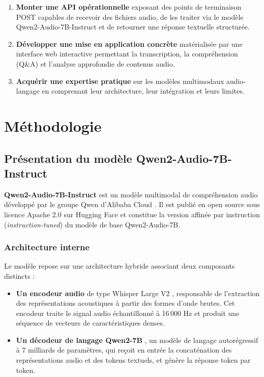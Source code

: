 \documentclass[12pt,a4paper]{report}
\begin{document}
\begin{enumerate}
  \item \textbf{Monter une API opérationnelle} exposant des points de terminaison POST
        capables de recevoir des fichiers audio, de les traiter via le modèle
        Qwen2-Audio-7B-Instruct et de retourner une réponse textuelle structurée.

  \item \textbf{Développer une mise en application concrète} matérialisée par une interface
        web interactive permettant la transcription, la compréhension (Q\&A) et l'analyse
        approfondie de contenus audio.

  \item \textbf{Acquérir une expertise pratique} sur les modèles multimodaux audio-langage
        en comprenant leur architecture, leur intégration et leurs limites.
\end{enumerate}

\chapter{Méthodologie}

\section{Présentation du modèle Qwen2-Audio-7B-Instruct}

\textbf{Qwen2-Audio-7B-Instruct} est un modèle multimodal de compréhension audio développé
par le groupe Qwen d'Alibaba Cloud \cite{qwen2audio}. Il est publié en open source sous
licence Apache 2.0 sur Hugging Face et constitue la version affinée par instruction
(\textit{instruction-tuned}) du modèle de base Qwen2-Audio-7B.

\subsection{Architecture interne}

Le modèle repose sur une architecture hybride associant deux composants distincts :

\begin{itemize}
  \item \textbf{Un encodeur audio} de type Whisper Large V2 \cite{whisper}, responsable de
        l'extraction des représentations acoustiques à partir des formes d'onde brutes.
        Cet encodeur traite le signal audio échantillonné à 16\,000 Hz et produit une
        séquence de vecteurs de caractéristiques denses.

  \item \textbf{Un décodeur de langage Qwen2-7B} \cite{qwen2}, un modèle de langage
        autorégressif à 7 milliards de paramètres, qui reçoit en entrée la concaténation
        des représentations audio et des tokens textuels, et génère la réponse token par
        token.
\end{itemize}
\end{document}
